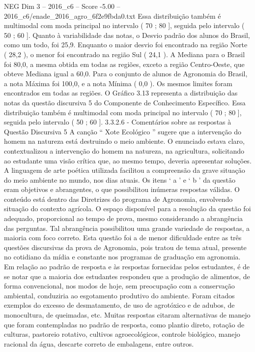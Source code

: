 \begin{textsample}{NEG Dim 3 – 2016\_c6 – Score -5.00 – 2016\_c6/enade\_2016\_agro\_6f2e9fbda0.txt}
Essa distribuição também é multimodal com moda principal no intervalo ( 70 ; 80 ], seguida pelo intervalo ( 50 ; 60 ].
Quanto à variabilidade das notas, o Desvio padrão dos alunos do Brasil, como um todo, foi 25,9.
Enquanto o maior desvio foi encontrado na região Norte ( 28,2 ), o menor foi encontrado na região Sul ( 24,1 ).
A Mediana para o Brasil foi 80,0, a mesma obtida em todas as regiões, exceto a região Centro-Oeste, que obteve Mediana igual a 60,0.
Para o conjunto de alunos de Agronomia do Brasil, a nota Máxima foi 100,0, e a nota Mínima ( 0,0 ).
Os mesmos limites foram encontrados em todas as regiões.
O Gráfico 3.13 representa a distribuição das notas da questão discursiva 5 do Componente de Conhecimento Específico.
Essa distribuição também é multimodal com moda principal no intervalo ( 70 ; 80 ], seguida pelo intervalo ( 50 ; 60 ]. 3.3.2.6 - Comentários sobre as respostas à Questão Discursiva 5 A canção “ Xote Ecológico ” sugere que a intervenção do homem na natureza está destruindo o meio ambiente.
O enunciado estava claro, contextualizou a intervenção do homem na natureza, na agricultura, solicitando ao estudante uma visão crítica que, ao mesmo tempo, deveria apresentar soluções.
A linguagem de arte poética utilizada facilitou a compreensão da grave situação do meio ambiente no mundo, nos dias atuais.
Os itens ‘ a ’ e ‘ b ’ da questão eram objetivos e abrangentes, o que possibilitou inúmeras respostas válidas.
O conteúdo está dentro das Diretrizes do programa de Agronomia, envolvendo situação do contexto agrícola.
O espaço disponível para a resolução da questão foi adequado, proporcional ao tempo de prova, mesmo considerando a abrangência das perguntas.
Tal abrangência possibilitou uma grande variedade de respostas, a maioria com foco correto.
Esta questão foi a de menor dificuldade entre as três questões discursivas da prova de Agronomia, pois tratou de tema atual, presente no cotidiano da mídia e constante nos programas de graduação em agronomia.
Em relação ao padrão de resposta e às respostas fornecidas pelos estudantes, é de se notar que a maioria dos estudantes respondeu que a produção de alimentos, de forma convencional, nos modos de hoje, sem preocupação com a conservação ambiental, conduziria ao esgotamento produtivo do ambiente.
Foram citados exemplos do excesso de desmatamento, de uso de agrotóxico e de adubos, de monocultura, de queimadas, etc.
Muitas respostas citaram alternativas de manejo que foram contempladas no padrão de resposta, como plantio direto, rotação de culturas, pastoreio rotativo, cultivos agroecológicos, controle biológico, manejo racional da água, descarte correto de embalagens, entre outros.

\end{textsample}
